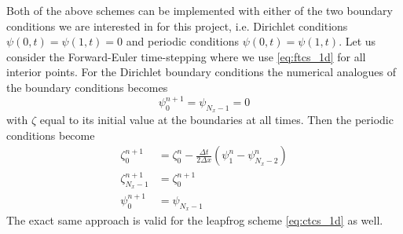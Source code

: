 \documentclass[12pt]{article}
\numberwithin{figure}{section}
\numberwithin{table}{section}
\begin{document}
\noindent Both of the above schemes can be implemented with either of the two boundary conditions we are interested in for this project, i.e. Dirichlet conditions $\psi(0,t)=\psi(1,t)=0$ and periodic conditions $\psi(0,t)=\psi(1,t)$. Let us consider the Forward-Euler time-stepping where we use \eqref{eq:ftcs_1d} for all interior points. For the Dirichlet boundary conditions the numerical analogues of the boundary conditions becomes
\begin{equation}
	\psi_0^{n+1}=\psi_{N_x-1}=0 \label{eq:dirichlet_1d}
\end{equation}
with $\zeta$ equal to its initial value at the boundaries at all times. Then the periodic conditions become
\begin{align}
	\zeta_0^{n+1}&=\zeta_0^n-\frac{\Delta t}{2\Delta x}(\psi_{1}^n-\psi_{N_x-2}^n) \\[0.20cm]
    \zeta_{N_x-1}^{n+1}&=\zeta_0^{n+1} \\
    \psi_0^{n+1}&=\psi_{N_x-1}
\end{align}
The exact same approach is valid for the leapfrog scheme \eqref{eq:ctcs_1d} as well. \\
\end{document}
